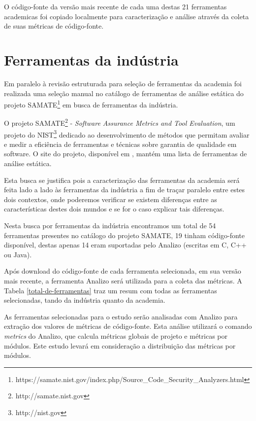 O código-fonte da versão mais recente de cada uma destas 21 ferramentas academicas foi
copiado localmente para caracterização e análise através da coleta de suas
métricas de código-fonte.

\section{Ferramentas da indústria} \label{ferramentas-da-industria}

Em paralelo à revisão estruturada para seleção de ferramentas da academia
foi realizada uma seleção manual no catálogo de ferramentas de análise estática do projeto
SAMATE\footnote{https://samate.nist.gov/index.php/Source\_Code\_Security\_Analyzers.html}
em busca de ferramentas da indústria.

O projeto SAMATE\footnote{http://samate.nist.gov} - {\em Software Assurance
Metrics and Tool Evaluation}, um projeto do NIST\footnote{http://nist.gov}
dedicado ao desenvolvimento de métodos que permitam avaliar e medir a
eficiência de ferramentas e técnicas sobre garantia de qualidade em software.
O site do projeto, disponível em , mantém uma lista
de ferramentas de análise estática.

Esta busca se justifica pois a caracterização das ferramentas da academia será feita lado a
lado às ferramentas da indústria a fim de traçar paralelo entre estes dois contextos, onde
poderemos verificar se existem diferenças entre as características destes dois mundos e
se for o caso explicar tais diferenças.

Nesta busca por ferramentas da indústria encontramos um total de 54 ferramentas
presentes no catálogo do projeto SAMATE, 19 tinham código-fonte disponível,
destas apenas 14 eram suportadas pelo Analizo (escritas em C, C++ ou Java).

Após download do código-fonte de cada ferramenta selecionada, em sua versão
mais recente, a ferramenta Analizo será utilizada para a coleta das métricas. 
A Tabela \ref{total-de-ferramentas} traz um resum com todas as ferramentas
selecionadas, tando da indústria quanto da academia.

As ferramentas selecionadas para o estudo serão analisadas com Analizo para
extração dos valores de métricas de código-fonte.  Esta análise utilizará o
comando {\it metrics} do Analizo, que calcula métricas globais de projeto e
métricas por módulos. Este estudo levará em consideração a distribuição das
métricas por módulos.
